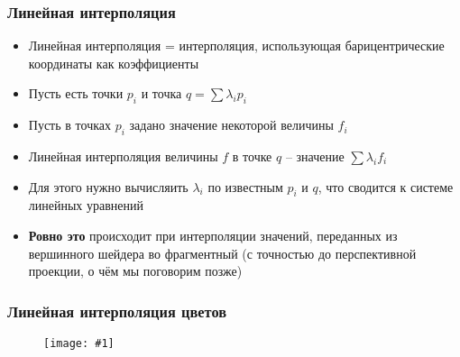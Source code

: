 \documentclass[10pt]{beamer}
\newcommand{\slideimage}[1]{
  \begin{figure}
    \begin{adjustbox}{width=\textwidth, totalheight=\textheight-2\baselineskip-2\baselineskip,keepaspectratio}
      \texttt{[image: \#1]}
    \end{adjustbox}
  \end{figure}
}
\begin{document}
\begin{frame}[fragile]
\frametitle{Линейная интерполяция}
\begin{itemize}
\item Линейная интерполяция = интерполяция, использующая барицентрические координаты как коэффициенты
\pause
\item Пусть есть точки \begin{math}p_i\end{math} и точка \begin{math}q = \sum \lambda_i p_i\end{math}
\pause
\item Пусть в точках \begin{math}p_i\end{math} задано значение некоторой величины \begin{math}f_i\end{math}
\pause
\item Линейная интерполяция величины \begin{math}f\end{math} в точке \begin{math}q\end{math} -- значение \begin{math}\sum \lambda_i f_i\end{math}
\pause
\item Для этого нужно вычисляить \begin{math}\lambda_i\end{math} по известным \begin{math}p_i\end{math} и \begin{math}q\end{math}, что сводится к системе линейных уравнений
\pause
\item \textbf{Ровно это} происходит при интерполяции значений, переданных из вершинного шейдера во фрагментный \pause (с точностью до перспективной проекции, о чём мы поговорим позже)
\end{itemize}
\end{frame}

\begin{frame}[fragile]
\frametitle{Линейная интерполяция цветов}
\slideimage{triangle.png}
\end{frame}
\end{document}
